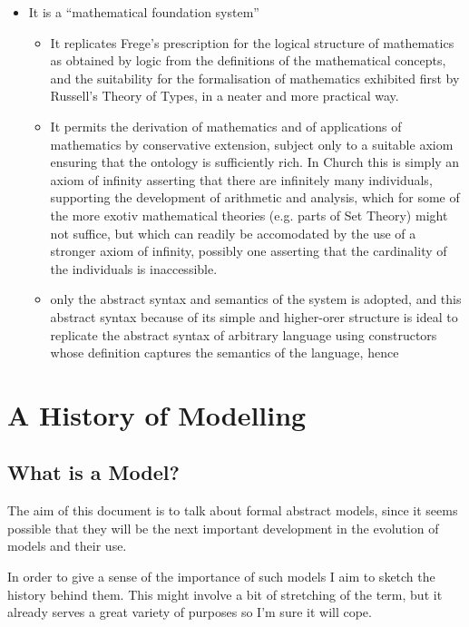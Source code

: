 \documentclass[10pt,titlepage]{book}
\begin{document}
\begin{itemize}
\item It is a ``mathematical foundation system''
  \begin{itemize}
  \item It replicates Frege's prescription for the logical structure of mathematics as obtained by logic from the definitions of the mathematical concepts,  and the suitability for the formalisation of mathematics exhibited first by Russell's Theory of Types, in a neater and more practical way.
  \item It permits the derivation of mathematics and of applications of mathematics by conservative extension, subject only to a suitable axiom ensuring that the ontology is sufficiently rich.
    In Church this is simply an axiom of infinity asserting that there are infinitely many individuals, supporting the development of arithmetic and analysis, which for some of the more exotiv mathematical theories (e.g. parts of Set Theory) might not suffice, but which can readily be accomodated by the use of a stronger axiom of infinity, possibly one asserting that the cardinality of the individuals is inaccessible.
    \item only the abstract syntax and semantics of the system is adopted, and this abstract syntax because of its simple and higher-orer structure is ideal to replicate the abstract syntax of arbitrary language using constructors whose definition captures the semantics of the language, hence 
    \end{itemize}
\end{itemize}

\cite{gordon1989mechanizing,birtwistle2012current}

\cite{cohnPIHV}
\cite{mccarthy2022artificial}

\section{A History of Modelling}

\subsection{What is a Model?}

The aim of this document is to talk about formal abstract models, since it seems possible that they will be the next important development in the evolution of models and their use.

In order to give a sense of the importance of such models I aim to sketch the history behind them.
This might involve a bit of stretching of the term, but it already serves a great variety of purposes so I'm sure it will cope.
\end{document}
